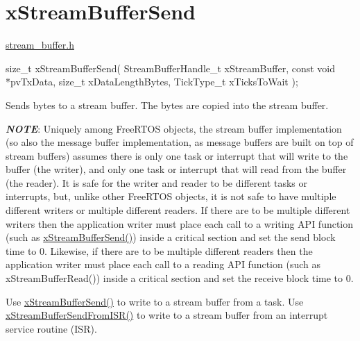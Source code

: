 \hypertarget{group__x_stream_buffer_send}{}\section{x\+Stream\+Buffer\+Send}
\label{group__x_stream_buffer_send}
\mbox{\hyperlink{stream__buffer_8h}{stream\+\_\+buffer.\+h}}


\begin{DoxyPre}
size\_t xStreamBufferSend( StreamBufferHandle\_t xStreamBuffer,
                          const void *pvTxData,
                          size\_t xDataLengthBytes,
                          TickType\_t xTicksToWait );
\end{DoxyPre}


Sends bytes to a stream buffer. The bytes are copied into the stream buffer.

{\itshape {\bfseries{N\+O\+TE}}}\+: Uniquely among Free\+R\+T\+OS objects, the stream buffer implementation (so also the message buffer implementation, as message buffers are built on top of stream buffers) assumes there is only one task or interrupt that will write to the buffer (the writer), and only one task or interrupt that will read from the buffer (the reader). It is safe for the writer and reader to be different tasks or interrupts, but, unlike other Free\+R\+T\+OS objects, it is not safe to have multiple different writers or multiple different readers. If there are to be multiple different writers then the application writer must place each call to a writing A\+PI function (such as \mbox{\hyperlink{stream__buffer_8h_a35cdf3b6bf677086b9128782f762499d}{x\+Stream\+Buffer\+Send()}}) inside a critical section and set the send block time to 0. Likewise, if there are to be multiple different readers then the application writer must place each call to a reading A\+PI function (such as x\+Stream\+Buffer\+Read()) inside a critical section and set the receive block time to 0.

Use \mbox{\hyperlink{stream__buffer_8h_a35cdf3b6bf677086b9128782f762499d}{x\+Stream\+Buffer\+Send()}} to write to a stream buffer from a task. Use \mbox{\hyperlink{stream__buffer_8h_a1dab226e99230e01e79bc2b5c0605e44}{x\+Stream\+Buffer\+Send\+From\+I\+S\+R()}} to write to a stream buffer from an interrupt service routine (I\+SR).


